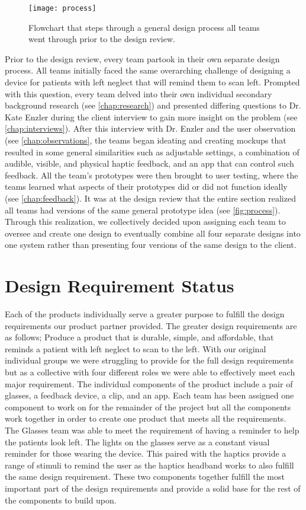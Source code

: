\begin{figure}[h]
  \centering
  \texttt{[image: process]}
  \caption[Design Process]{Flowchart that steps through a general design
    process all teams went through prior to the design review.}
  \label{fig:process}
\end{figure}

Prior to the design review, every team partook in their own separate design
process. All teams initially faced the same overarching challenge of designing a
device for patients with left neglect that will remind them to scan
left. Prompted with this question, every team delved into their own individual
secondary background research (see \autoref{chap:research}) and presented differing
questions to Dr. Kate Enzler during the client interview to gain more insight on
the problem (see \autoref{chap:interviews}). After this interview with
Dr. Enzler and the user observation (see \autoref{chap:observations}, the teams
began ideating and creating mockups that resulted in some
general similarities such as adjustable settings, a combination of audible,
visible, and physical haptic feedback, and an app that can control such
feedback. All the team’s prototypes were then brought to user testing, where
the teams learned what aspects of their prototypes did or did not function
ideally (see \autoref{chap:feedback}). It was at the design review that the entire
section realized all teams had versions of the same general prototype idea
(see \autoref{fig:process}).
Through this realization, we collectively decided upon assigning each
team to oversee and create one design to eventually combine all four separate
designs into one system rather than presenting four versions of the same design
to the client. 

\section{Design Requirement Status}

Each of the products individually serve a greater purpose to fulfill the design
requirements our product partner provided. The greater design requirements are
as follows; Produce a product that is durable, simple, and affordable, that
reminds a patient with left neglect to scan to the left. With our original
individual groups we were struggling to provide for the full design requirements
but as a collective with four different roles we were able to effectively meet
each major requirement. The individual components of the product include a pair
of glasses, a feedback device, a clip, and an app. Each team has been assigned
one component to work on for the remainder of the project but all the components
work together in order to create one product that meets all the
requirements. The Glasses team was able to meet the requirement of having a
reminder to help the patients look left. The lights on the glasses serve as a
constant visual reminder for those wearing the device. This paired with the
haptics provide a range of stimuli to remind the user as the haptics headband
works to also fulfill the same design requirement. These two components together
fulfill the most important part of the design requirements and provide a solid
base for the rest of the components to build upon. 

